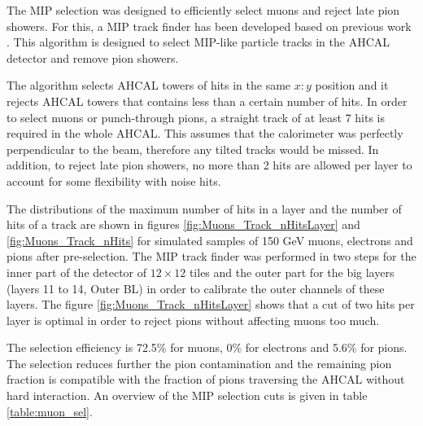 The MIP selection was designed to efficiently select muons and reject late pion showers. For this, a MIP track finder has been developed based on previous work \cite{Hartbrich:2016bbz}. This algorithm is designed to select MIP-like particle tracks in the AHCAL detector and remove pion showers.

The algorithm selects AHCAL towers of hits in the same $x:y$ position and it rejects AHCAL towers that contains less than a certain number of hits. In order to select muons or punch-through pions, a straight track of at least 7 hits is required in the whole AHCAL. This assumes that the calorimeter was perfectly perpendicular to the beam, therefore any tilted tracks would be missed. In addition, to reject late pion showers, no more than 2 hits are allowed per layer to account for some flexibility with noise hits.

The distributions of the maximum number of hits in a layer and the number of hits of a track are shown in figures \ref{fig:Muons_Track_nHitsLayer} and \ref{fig:Muons_Track_nHits} for simulated samples of 150 GeV muons, electrons and pions after pre-selection. The MIP track finder was performed in two steps for the inner part of the detector of $12 \times 12$ tiles and the outer part for the big layers (layers 11 to 14, Outer BL) in order to calibrate the outer channels of these layers. The figure \ref{fig:Muons_Track_nHitsLayer} shows that a cut of two hits per layer is optimal in order to reject pions without affecting muons too much.

The selection efficiency is 72.5\% for muons, 0\% for electrons and 5.6\% for pions. The selection reduces further the pion contamination and the remaining pion fraction is compatible with the fraction of pions traversing the AHCAL without hard interaction. An overview of the MIP selection cuts is given in table \ref{table:muon_sel}.

